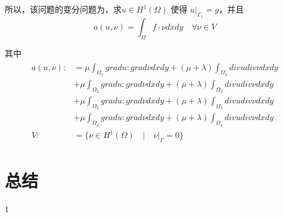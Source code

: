 \documentclass[a4paper,UTF8,titlepage]{ctexart}
\begin{document}
所以，该问题的变分问题为，求$u \in H^1(\Omega)$ 使得 $u |_{\Gamma_1} = g$，并且
$$
a(u,\nu) = \int_{\Omega} f \cdot \nu dxdy \quad \forall \nu \in V
$$ 
\par
其中
$$
\begin{matrix}
	\begin{aligned}
		a(u,\nu) :&= \mu \int_{\Omega_1} grad u : grad \nu dxdy + (\mu +\lambda) \int_{\Omega_1} div u div \nu  dxdy \\
		&+ \mu \int_{\Omega_2} grad u : grad \nu dxdy + (\mu +\lambda) \int_{\Omega_2} div u div \nu  dxdy \\
		&+ \mu \int_{\Omega_3} grad u : grad \nu dxdy + (\mu +\lambda) \int_{\Omega_3} div u div \nu  dxdy \\
		&+ \mu \int_{\Omega_4} grad u : grad \nu dxdy + (\mu +\lambda) \int_{\Omega_4} div u div \nu  dxdy\\
		V :&= \{ \nu \in H^1(\Omega) \quad | \quad \nu |_{\Gamma} = 0 \}
	\end{aligned}
\end{matrix}
$$

\section{总结}

1

\newpage
\vfill


\clearpage
{}
{}

\end{document}

